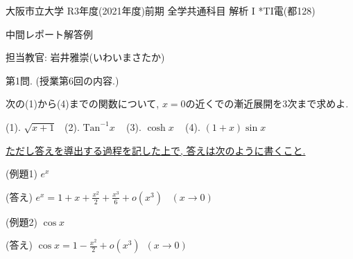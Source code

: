 \documentclass[dvipdfmx,a4paper,11pt]{article}
\newcommand{\Tan}{\text{Tan}^{-1}}
\theoremstyle{definition}
\begin{document}
\begin{center}
{ \large 大阪市立大学 R3年度(2021年度)前期 全学共通科目 解析 I *TI電(都128)} \\
\vspace{5pt}

{\LARGE 中間レポート解答例} \\
\vspace{5pt}

\end{center}

\begin{flushright}
 担当教官: 岩井雅崇(いわいまさたか) 
\end{flushright}

{\Large 第1問.} (授業第6回の内容.)
\vspace{11pt}

次の(1)から(4)までの関数について, $x=0$の近くでの漸近展開を3次まで求めよ.


\vspace{11pt}

(1). $\sqrt{x+1}$\,\,\,
(2). $\Tan x$ \,\,\,
(3). $\cosh x$ \,\,\,
(4). $(1+ x) \sin x$

\vspace{11pt}

\underline{ただし答えを導出する過程を記した上で, 答えは次のように書くこと.}

\vspace{11pt}

(例題1) $e^x$ 

(答え) $e^x = 1 + x + \frac{x^2}{2} + \frac{x^3}{6}  + o(x^3)$\,\,\,
$(x \rightarrow 0)$


\vspace{11pt}

(例題2) $\cos x$

(答え) $\cos x= 1 - \frac{x^2}{2} + o(x^3)$\,\,\,$(x \rightarrow 0)$

 \vspace{11pt}
 
\end{document}
